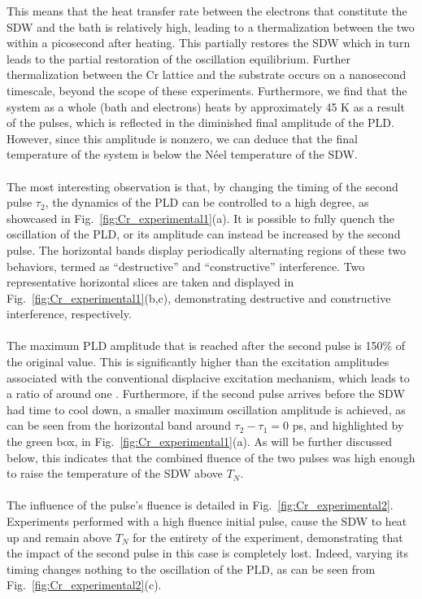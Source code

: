 This means that the heat transfer rate between the electrons that constitute the SDW and the bath is relatively high, leading to a thermalization between the two within a picosecond after heating.
This partially restores the SDW which in turn leads to the partial restoration of the oscillation equilibrium.
Further thermalization between the Cr lattice and the substrate occurs on a nanosecond timescale, beyond the scope of these experiments.
Furthermore, we find that the system as a whole (bath and electrons) heats by approximately 45 K as a result of the pulses, which is reflected in the diminished final amplitude of the PLD.
However, since this amplitude is nonzero, we can deduce that the final temperature of the system is below the N\'eel temperature of the SDW.
\\\\
The most interesting observation is that, by changing the timing of the second pulse $\tau_2$, the dynamics of the PLD can be controlled to a high degree, as showcased in Fig.~\ref{fig:Cr_experimental1}(a).
It is possible to fully quench the oscillation of the PLD, or its amplitude can instead be increased by the second pulse.
The horizontal bands display periodically alternating regions of these two behaviors, termed as ``destructive'' and ``constructive'' interference.
Two representative horizontal slices are taken and displayed in Fig.~\ref{fig:Cr_experimental1}(b,c), demonstrating destructive and constructive interference, respectively. 
\\\\
The maximum PLD amplitude that is reached after the second pulse is 150\% of the original value.
This is significantly higher than the excitation amplitudes associated with the conventional displacive excitation mechanism, which leads to a ratio of around one \cite{Singer2015prl,Zeiger1992}. 
Furthermore, if the second pulse arrives before the SDW had time to cool down, a smaller maximum oscillation amplitude is achieved, as can be seen from the horizontal band around $\tau_2 - \tau_1 = 0$ ps, and highlighted by the green box, in Fig.~\ref{fig:Cr_experimental1}(a).
As will be further discussed below, this indicates that the combined fluence of the two pulses was high enough to raise the temperature of the SDW above $T_N$.
\\\\
The influence of the pulse's fluence is detailed in Fig.~\ref{fig:Cr_experimental2}.
Experiments performed with a high fluence initial pulse, cause the SDW to heat up and remain above $T_N$ for the entirety of the experiment, demonstrating that the impact of the second pulse in this case is completely lost. Indeed, varying its timing changes nothing to the oscillation of the PLD, as can be seen from Fig.~\ref{fig:Cr_experimental2}(c).

